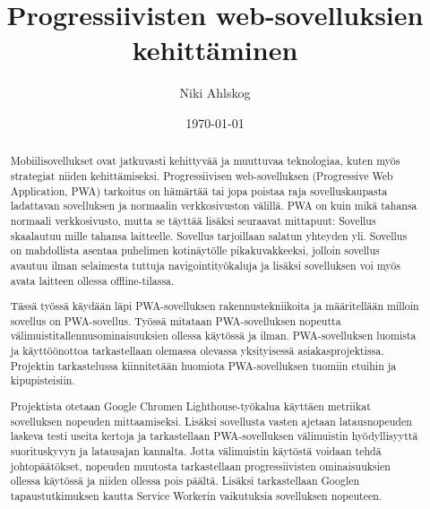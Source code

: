 \documentclass{tktltiki}
\begin{document}
\singlespacing

\title{Progressiivisten web-sovelluksien kehittäminen}
\author{Niki Ahlskog}

\date{\today}

\maketitle






\begin{abstract}

Mobiilisovellukset ovat jatkuvasti kehittyvää ja muuttuvaa teknologiaa, kuten myös strategiat niiden kehittämiseksi. Progressiivisen web-sovelluksen (Progressive Web Application, PWA) tarkoitus on hämärtää tai jopa poistaa raja sovelluskaupasta ladattavan sovelluksen ja normaalin verkkosivuston välillä. PWA on kuin mikä tahansa normaali verkkosivusto, mutta se täyttää lisäksi seuraavat mittapuut: Sovellus skaalautuu mille tahansa laitteelle. Sovellus tarjoillaan salatun yhteyden yli. Sovellus on mahdollista asentaa puhelimen kotinäytölle pikakuvakkeeksi, jolloin sovellus avautuu ilman selaimesta tuttuja navigointityökaluja ja lisäksi sovelluksen voi myös avata laitteen ollessa offline-tilassa. 

Tässä työssä käydään läpi PWA-sovelluksen rakennustekniikoita ja määritellään milloin sovellus on PWA-sovellus. Työssä mitataan PWA-sovelluksen nopeutta välimuistitallennusominaisuuksien ollessa käytössä ja ilman. PWA-sovelluksen luomista ja käyttöönottoa tarkastellaan olemassa olevassa yksityisessä asiakasprojektissa. Projektin tarkastelussa kiinnitetään huomiota PWA-sovelluksen tuomiin etuihin ja kipupisteisiin.

Projektista otetaan Google Chromen Lighthouse-työkalua käyttäen metriikat sovelluksen nopeuden mittaamiseksi. Lisäksi sovellusta vasten ajetaan latausnopeuden laskeva testi useita kertoja ja tarkastellaan PWA-sovelluksen välimuistin hyödyllisyyttä suorituskyvyn ja latausajan kannalta. Jotta välimuistin käytöstä voidaan tehdä johtopäätökset, nopeuden muutosta tarkastellaan  progressiivisten ominaisuuksien ollessa käytössä ja niiden ollessa pois päältä. Lisäksi tarkastellaan Googlen tapaustutkimuksen kautta Service Workerin vaikutuksia sovelluksen nopeuteen. 


\end{abstract}
\end{document}
